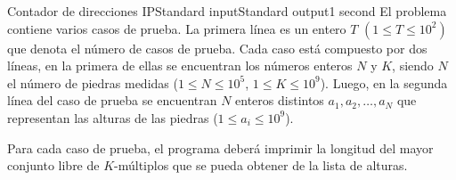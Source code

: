 \begin{problem}{Contador de direcciones IP}{Standard input}{Standard output}{1 second}{}
\InputFile
El problema contiene varios casos de prueba. La primera l\'inea es un entero $T$ $(1\leq T \leq 10^2)$ que denota el número de casos de prueba. Cada caso está compuesto por dos l\'ineas, en la primera de ellas se encuentran los n\'umeros enteros $N$ y $K$, siendo $N$ el número de piedras medidas ($1 \leq N \leq 10^5$, $1 \leq K \leq 10^9$). Luego, en la segunda l\'inea del caso de prueba se encuentran $N$ enteros distintos $a_1, a_2, \dots, a_N$ que representan las alturas de las piedras ($1 \leq a_i \leq 10^9$).

\OutputFile
Para cada caso de prueba, el programa deber\'a imprimir la longitud del mayor conjunto libre de $K$-m\'ultiplos que se pueda obtener de la lista de alturas.

\Example

\begin{example}
\end{example}

\end{problem}
